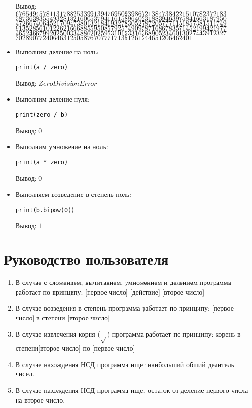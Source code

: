\begin{itemize}
\begin{lstlisting}
        \end{lstlisting}
        Вывод:\\
        $67654945781131788253399139476950939867213847384221510782372183$
        $38736383554932818216005379411615896402318839463975841663187950$
        $47266740645217094738013218419327830527872057771151857381511749$
        $91352856101226216668855950857925749095871686783571452199421977$
        $46524667992025003348862025953101533163689052346013027443912327$
        $3028907724064631250587670777171351261244651206462401$
        \item Выполним деление на ноль:
        \begin{lstlisting}
print(a / zero)
        \end{lstlisting}
        Вывод: $ZeroDivisionError$
        \item Выполним деление нуля:
        \begin{lstlisting}
print(zero / b)
        \end{lstlisting}
        Вывод: $0$
        \item Выполним умножение на ноль:
        \begin{lstlisting}
print(a * zero)
        \end{lstlisting}
        Вывод: $0$
        \item Выполняем возведение в степень ноль:
        \begin{lstlisting}
print(b.bipow(0))
        \end{lstlisting}
        Вывод: $1$
    \end{itemize}


\clearpage
\section{Руководство пользователя}
    \begin{enumerate}
        \item В случае с сложением, вычитанием, умножением и делением программа работает по принципу:
        [первое число] [действие] [второе число]
        \item В случае возведения в степень программа работает по принципу:
        [первое число] в степени [второе число]
        \item В случае извлечения корня ($\sqrt{}$) программа работает по принципу:
        корень в степени[второе число] по [первое число]
        \item В случае нахождения НОД программа ищет наибольший общий делитель чисел.
        \item В случае нахождения НОД программа ищет остаток от деление первого числа на второе число.
    \end{enumerate}


